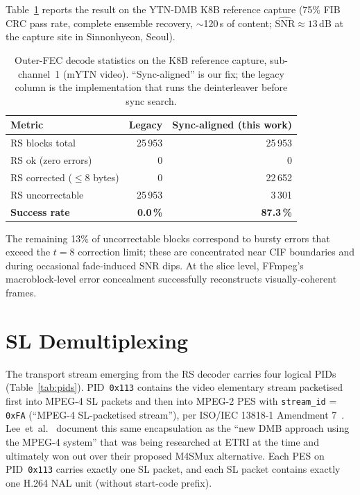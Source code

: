 \documentclass[11pt,a4paper]{article}
\begin{document}
Table~\ref{tab:rs} reports the result on the YTN-DMB K8B reference
capture (75\% FIB CRC pass rate, complete ensemble recovery,
$\sim$120\,s of content; $\hat{\mathrm{SNR}}\approx 13$\,dB at the
capture site in Sinnonhyeon, Seoul).

\begin{table}[t]
\centering
\caption{Outer-FEC decode statistics on the K8B reference capture,
sub-channel~1 (mYTN video).  ``Sync-aligned'' is our fix; the legacy
column is the implementation that runs the deinterleaver before sync
search.}
\label{tab:rs}
\begin{tabular}{lrr}
\toprule
Metric & Legacy & Sync-aligned (this work) \\
\midrule
RS blocks total                 & 25\,953 & 25\,953 \\
RS ok (zero errors)             & 0       & 0 \\
RS corrected ($\leq8$ bytes)    & 0       & 22\,652 \\
RS uncorrectable                & 25\,953 & 3\,301 \\
\textbf{Success rate}           & \textbf{0.0\,\%} & \textbf{87.3\,\%} \\
\bottomrule
\end{tabular}
\end{table}

The remaining 13\% of uncorrectable blocks correspond to bursty
errors that exceed the $t=8$ correction limit; these are concentrated
near CIF boundaries and during occasional fade-induced SNR dips.
At the slice level, FFmpeg's macroblock-level error concealment
successfully reconstructs visually-coherent frames.

\section{SL Demultiplexing}\label{sec:sl}

The transport stream emerging from the RS decoder carries four logical
PIDs (Table~\ref{tab:pids}).  PID~\texttt{0x113} contains the video
elementary stream packetised first into MPEG-4 SL packets and then
into MPEG-2 PES with \texttt{stream\_id} = \texttt{0xFA}
(``MPEG-4 SL-packetised stream''), per ISO/IEC 13818-1 Amendment
7~\cite{iso13818-1-amd7}.  Lee~et~al.~\cite{lee2004m4smux} document
this same encapsulation as the ``new DMB approach using the MPEG-4
system'' that was being researched at ETRI at the time and
ultimately won out over their proposed M4SMux alternative.
Each PES on PID~\texttt{0x113} carries exactly one SL packet, and
each SL packet contains exactly one H.264 NAL unit (without
start-code prefix).
\end{document}
